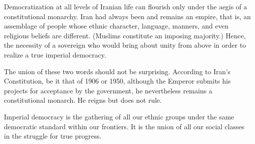 Democratization at all levels of Iranian life can flourish only under the aegis of a constitutional monarchy. Iran had always been and remains an empire, that is, an assemblage of people whose ethnic character, language, manners, and even religious beliefs are different. (Muslims constitute an imposing majority.) Hence, the necessity of a sovereign who would bring about unity from above in order to realize a true imperial democracy. 

The union of these two words should not be surprising. According to Iran's Constitution, be it that of 1906 or 1950, although the Emperor submits his projects for acceptance by the government, he nevertheless remains a constitutional monarch. He reigns but does not rule. 

Imperial democracy is the gathering of all our ethnic groups under the same democratic standard within our frontiers. It is the union of all our social classes in the struggle for true progress. 